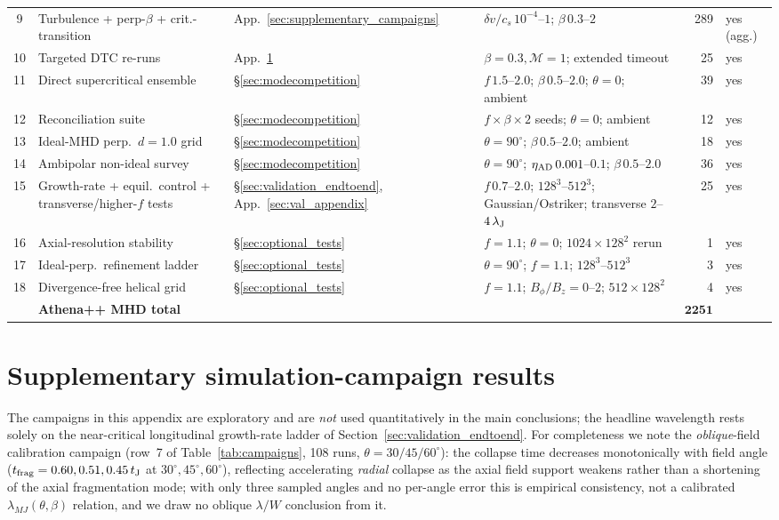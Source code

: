 \documentclass[usenatbib,twoside,twocolumn]{mnras}
\begin{document}
\begin{table}
\begin{tabular}{@{}c p{3.4cm} l p{4.0cm} r l@{}}
9  & Turbulence + perp-$\beta$ + crit.-transition & App.~\ref{sec:supplementary_campaigns} & $\delta v/c_s\,10^{-4}$--$1$; $\beta\,0.3$--$2$ & 289 & yes (agg.) \\
10 & Targeted DTC re-runs & App.~\ref{sec:supplementary_campaigns_app} & $\beta=0.3,\mathcal{M}=1$; extended timeout & 25 & yes \\
11 & Direct supercritical ensemble & \S\ref{sec:modecompetition} & $f\,1.5$--$2.0$; $\beta\,0.5$--$2.0$; $\theta=0$; ambient & 39 & yes \\
12 & Reconciliation suite & \S\ref{sec:modecompetition} & $f\times\beta\times2$ seeds; $\theta=0$; ambient & 12 & yes \\
13 & Ideal-MHD perp.\ $d=1.0$ grid & \S\ref{sec:modecompetition} & $\theta=90^\circ$; $\beta\,0.5$--$2.0$; ambient & 18 & yes \\
14 & Ambipolar non-ideal survey & \S\ref{sec:modecompetition} & $\theta=90^\circ$; $\eta_{\rm AD}\,0.001$--$0.1$; $\beta\,0.5$--$2.0$ & 36 & yes \\
15 & Growth-rate + equil.\ control + transverse/higher-$f$ tests & \S\ref{sec:validation_endtoend}, App.~\ref{sec:val_appendix} & $f\,0.7$--$2.0$; $128^3$--$512^3$; Gaussian/Ostriker; transverse $2$--$4\,\lambda_{\rm J}$ & 25 & yes \\
16 & Axial-resolution stability & \S\ref{sec:optional_tests} & $f=1.1$; $\theta=0$; $1024\times128^2$ rerun & 1 & yes \\
17 & Ideal-perp.\ refinement ladder & \S\ref{sec:optional_tests} & $\theta=90^\circ$; $f=1.1$; $128^3$--$512^3$ & 3 & yes \\
18 & Divergence-free helical grid & \S\ref{sec:optional_tests} & $f=1.1$; $B_\phi/B_z=0$--$2$; $512\times128^2$ & 4 & yes \\
\midrule
   & \textbf{Athena++ MHD total} & & & $\boldsymbol{2251}$ & \\
\bottomrule
\end{tabular}
\end{table}

\section{Supplementary simulation-campaign results}
\label{sec:supplementary_campaigns_app}

The campaigns in this appendix are exploratory and are \emph{not} used quantitatively in the main conclusions; the headline wavelength rests solely on the near-critical longitudinal growth-rate ladder of Section~\ref{sec:validation_endtoend}. For completeness we note the \emph{oblique}-field calibration campaign (row~7 of Table~\ref{tab:campaigns}, 108 runs, $\theta=30/45/60^\circ$): the collapse time decreases monotonically with field angle ($t_{\rm frag}=0.60,0.51,0.45\,t_{\rm J}$ at $30^\circ,45^\circ,60^\circ$), reflecting accelerating \emph{radial} collapse as the axial field support weakens rather than a shortening of the axial fragmentation mode; with only three sampled angles and no per-angle error this is empirical consistency, not a calibrated $\lambda_{MJ}(\theta,\beta)$ relation, and we draw no oblique $\lambda/W$ conclusion from it.
\end{document}
